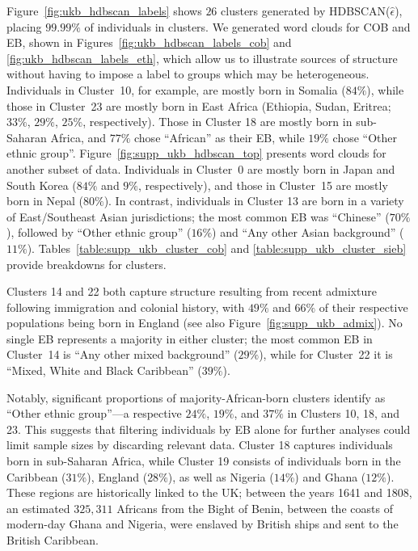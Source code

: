 Figure~\ref{fig:ukb_hdbscan_labels} shows $26$ clusters generated by HDBSCAN($\hat{\epsilon}$), placing $99.99\%$ of individuals in clusters. We generated word clouds for COB and EB, shown in Figures~\ref{fig:ukb_hdbscan_labels_cob} and \ref{fig:ukb_hdbscan_labels_eth}, which allow us to illustrate sources of structure without having to impose a label to groups which may be heterogeneous. Individuals in Cluster~10, for example, are mostly born in Somalia ($84\%$), while those in Cluster~23 are mostly born in East Africa (Ethiopia, Sudan, Eritrea; $33\%$, $29\%$, $25\%$, respectively). Those in Cluster 18 are mostly born in sub-Saharan Africa, and $77\%$ chose ``African'' as their EB, while $19\%$ chose ``Other ethnic group''. Figure~\ref{fig:supp_ukb_hdbscan_top} presents word clouds for another subset of data. Individuals in Cluster~0 are mostly born in Japan and South Korea ($84\%$ and $9\%$, respectively), and those in Cluster~15 are mostly born in Nepal ($80\%$). In contrast, individuals in Cluster 13 are born in a variety of East/Southeast Asian jurisdictions; the most common EB was ``Chinese'' ($70\%$), followed by ``Other ethnic group'' ($16\%$) and ``Any other Asian background'' ($11\%$). Tables~\ref{table:supp_ukb_cluster_cob} and \ref{table:supp_ukb_cluster_sieb} provide breakdowns for clusters.

Clusters 14 and 22 both capture structure resulting from recent admixture following immigration and colonial history, with $49\%$ and $66\%$ of their respective populations being born in England (see also Figure~\ref{fig:supp_ukb_admix}). No single EB represents a majority in either cluster; the most common EB in Cluster~14 is ``Any other mixed background'' ($29\%$), while for Cluster~22 it is ``Mixed, White and Black Caribbean'' ($39\%$). 

Notably, significant proportions of majority-African-born clusters identify as ``Other ethnic group''---a respective $24\%$, $19\%$, and $37\%$ in Clusters 10, 18, and 23. This suggests that filtering individuals by EB alone for further analyses could limit sample sizes by discarding relevant data. Cluster 18 captures individuals born in sub-Saharan Africa, while Cluster 19 consists of individuals born in the Caribbean ($31\%$), England ($28\%$), as well as Nigeria ($14\%$) and Ghana ($12\%$). These regions are historically linked to the UK; between the years 1641 and 1808, an estimated $325,311$ Africans from the Bight of Benin, between the coasts of modern-day Ghana and Nigeria, were enslaved by British ships and sent to the British Caribbean\citep{slavevoyages,fortes-lima_anthropological_2021}.

